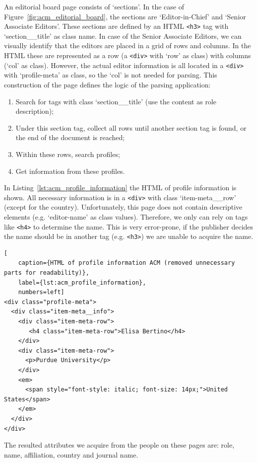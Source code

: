 \documentclass{ou-report}
\begin{document}
An editorial board page consists of `sections'. In the case of 
Figure~\ref{fig:acm_editorial_board}, the sections are `Editor-in-Chief'
and `Senior Associate Editors'.
These sections are defined by an HTML \verb|<h3>| 
tag with `section\_\_title' as class name. In case of the Senior 
Associate Editors, we can visually identify that the editors are placed 
in a grid of rows and columns. In the HTML these are represented as a
row (a \verb|<div>| with `row' as class) with columns (`col' as class).
However, the actual editor information is all located in a \verb|<div>| 
with `profile-meta' as class, so the `col' is not needed for parsing. 
This construction of the page defines the logic of the parsing 
application:
\begin{enumerate}
    \item Search for tags with class `section\_\_title' (use the content as role description);
    \item Under this section tag, collect all rows until another section tag
    is found, or the end of the document is reached;
    \item Within these rows, search profiles;
    \item Get information from these profiles.
\end{enumerate}

In Listing~\ref{lst:acm_profile_information} the HTML of profile information
is shown. All necessary information is in a \verb|<div>| with class 
`item-meta\_\_row' (except for the country). Unfortunately, this page does
not contain descriptive elements (e.g. `editor-name' as class values).
Therefore, we only can rely on tags like \verb|<h4>| to determine the name.
This is very error-prone, if the publisher decides the name should be in another 
tag (e.g. \verb|<h3>|) we are unable to acquire the name.

\newpage
\lstset{language=HTML}
\begin{lstlisting}[
    caption={HTML of profile information ACM (removed unnecessary parts for readability)},
    label={lst:acm_profile_information},
    numbers=left]
<div class="profile-meta">
  <div class="item-meta__info">
    <div class="item-meta-row">
       <h4 class="item-meta-row">Elisa Bertino</h4>
    </div>
    <div class="item-meta-row">
      <p>Purdue University</p>
    </div>
    <em>
      <span style="font-style: italic; font-size: 14px;">United States</span>
    </em>
  </div>
</div>
\end{lstlisting}

The resulted attributes we acquire from the people on these pages are: role,
name, affiliation, country and journal name.
\end{document}
